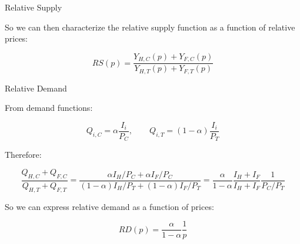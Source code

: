 \documentclass[notes,11pt, aspectratio=169, xcolor=table]{beamer}
\newenvironment{wideitemize}{\itemize\addtolength{\itemsep}{10pt}}{\enditemize}
\begin{document}
\begin{frame}{Relative Supply}
    \begin{wideitemize}
        
\item So we can then characterize the relative supply function as a function of relative prices:

\begin{equation*}
\boxed{
    RS(p) = \frac{Y_{H,C}\left(p\right) + Y_{F,C}\left(p\right)}{Y_{H,T}\left(p\right) + Y_{F,T}\left(p\right)}
}
\end{equation*}

    \end{wideitemize}
\end{frame}

\begin{frame}{Relative Demand}

\begin{wideitemize}
    
\item From demand functions:

\begin{equation*}
    Q_{i,C} = \alpha  \frac{I_i}{P_{C}}, \qquad Q_{i,T} = (1-\alpha) \frac{I_i}{P_{T}}
\end{equation*}

\item Therefore:

\begin{equation*}
    \frac{Q_{H,C} + Q_{F,C} }{Q_{H,T}  + Q_{F,T} } = \frac{\alpha I_H/P_C + \alpha I_F/P_C}{(1-\alpha) I_H/P_T + (1-\alpha) I_F/P_T} = \frac{\alpha}{1-\alpha} \frac{I_H + I_F}{I_H + I_F} \frac{1}{P_C/P_T}
\end{equation*}

So we can express relative demand as a function of prices:

\begin{equation*}
    \boxed{
    RD(p) = \frac{\alpha}{1-\alpha} \frac{1}{p}
    }
\end{equation*}

\end{wideitemize}
    
\end{frame}
\end{document}
